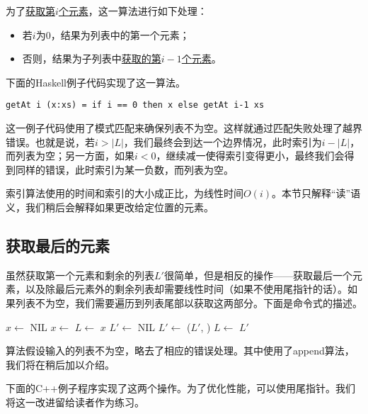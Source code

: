 \documentclass[UTF8]{article}
\begin{document}
为了\underline{获取第$i$个元素}，这一算法进行如下处理：
\begin{itemize}
\item 若$i$为0，结果为列表中的第一个元素；
\item 否则，结果为子列表中\underline{获取的第$i-1$个元素}。
\end{itemize}

下面的Haskell例子代码实现了这一算法。

\lstset{language=Haskell}
\begin{lstlisting}[style=Haskell]
getAt i (x:xs) = if i == 0 then x else getAt i-1 xs
\end{lstlisting}

这一例子代码使用了模式匹配来确保列表不为空。这样就通过匹配失败处理了越界错误。也就是说，若$i > |L|$，我们最终会到达一个边界情况，此时索引为$i - |L|$，而列表为空；另一方面，如果$i < 0$，继续减一使得索引变得更小，最终我们会得到同样的错误，此时索引为某一负数，而列表为空。

索引算法使用的时间和索引的大小成正比，为线性时间$O(i)$。本节只解释“读”语义，我们稍后会解释如果更改给定位置的元素。

\subsection{获取最后的元素}

虽然获取第一个元素和剩余的列表$L'$很简单，但是相反的操作——获取最后一个元素，以及除最后元素外的剩余列表却需要线性时间（如果不使用尾指针的话）。如果列表不为空，我们需要遍历到列表尾部以获取这两部分。下面是命令式的描述。

\begin{algorithmic}[1]
  \State $x \gets $ NIL
    \State $x \gets $ 
    \State $L \gets $ 
  \EndWhile
  \State \Return $x$
\EndFunction
\Statex
{}
  \State $L' \gets $ NIL
    \State $L' \gets$ ($L'$, )
    \State $L \gets $ 
  \EndWhile
  \State \Return $L'$
\EndFunction
\end{algorithmic}

算法假设输入的列表不为空，略去了相应的错误处理。其中使用了append算法，我们将在稍后加以介绍。

下面的C++例子程序实现了这两个操作。为了优化性能，可以使用尾指针。我们将这一改进留给读者作为练习。
\end{document}

